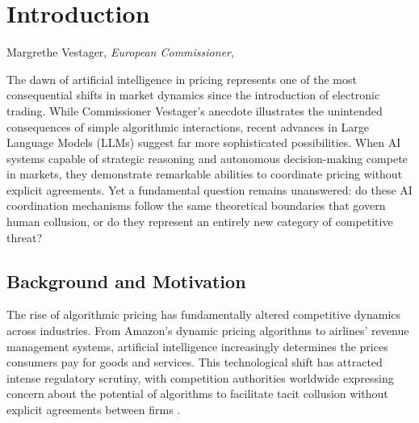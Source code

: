 \section{Introduction}\label{sec:intro}

\epigraph{}{Margrethe Vestager, \emph{European Commissioner}, ~\cite*{vestager_algorithms_2017}}


The dawn of artificial intelligence in pricing represents one of the most consequential shifts in market dynamics since the introduction of electronic trading. While Commissioner Vestager's anecdote illustrates the unintended consequences of simple algorithmic interactions, recent advances in Large Language Models (LLMs) suggest far more sophisticated possibilities. When AI systems capable of strategic reasoning and autonomous decision-making compete in markets, they demonstrate remarkable abilities to coordinate pricing without explicit agreements. Yet a fundamental question remains unanswered: do these AI coordination mechanisms follow the same theoretical boundaries that govern human collusion, or do they represent an entirely new category of competitive threat?

\subsection{Background and Motivation}
The rise of algorithmic pricing has fundamentally altered competitive dynamics across industries. From Amazon's dynamic pricing algorithms to airlines' revenue management systems, artificial intelligence increasingly determines the prices consumers pay for goods and services. This technological shift has attracted intense regulatory scrutiny, with competition authorities worldwide expressing concern about the potential of algorithms to facilitate tacit collusion without explicit agreements between firms \parencite{oecd_algorithmic_2023, harrington_developing_2018}. 

